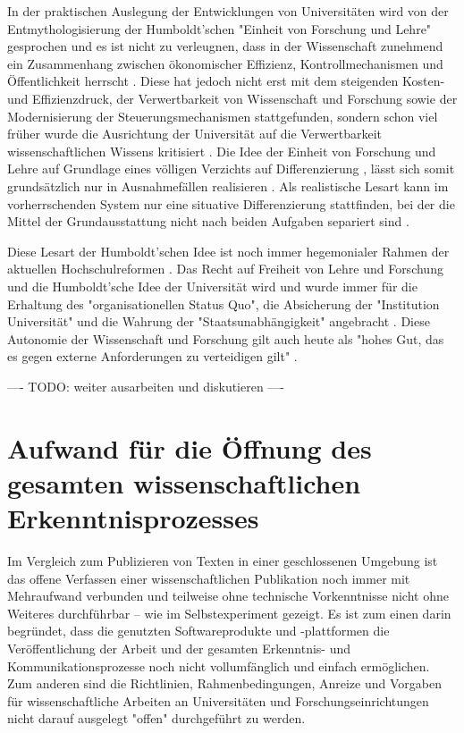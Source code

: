 In der praktischen Auslegung der Entwicklungen von Universitäten wird von der Entmythologisierung der Humboldt’schen "Einheit von Forschung und Lehre" gesprochen \cite{binswanger_2014_excellence} \cite[:299]{Schimank_2001} \cite[:343]{Kruecken_2001} und es ist nicht zu verleugnen, dass in der Wissenschaft zunehmend ein Zusammenhang zwischen ökonomischer Effizienz, Kontrollmechanismen und Öffentlichkeit herrscht \cite[:27]{Reinhart_intransparenz_2006} \cite{foucault_1977_uberwachen}. Diese hat jedoch nicht erst mit dem steigenden Kosten- und Effizienzdruck, der Verwertbarkeit von Wissenschaft und Forschung sowie der Modernisierung der Steuerungsmechanismen stattgefunden, sondern schon viel früher wurde die Ausrichtung der Universität auf die Verwertbarkeit wissenschaftlichen Wissens kritisiert \cite{Huber_2005}. Die Idee der Einheit von Forschung und Lehre auf Grundlage eines völligen Verzichts auf Differenzierung \cite{kittler_2004}, lässt sich somit grundsätzlich nur in Ausnahmefällen realisieren \cite{Schimank_2001}. Als realistische Lesart kann im vorherrschenden System nur eine situative Differenzierung stattfinden, bei der die Mittel der Grundausstattung nicht nach beiden Aufgaben separiert sind \cite{Schimank_2001}.

Diese Lesart der Humboldt’schen Idee ist noch immer hegemonialer Rahmen der aktuellen Hochschulreformen \cite{Huber_2005}. Das Recht auf Freiheit von Lehre und Forschung und die Humboldt’sche Idee der Universität wird und wurde immer für die Erhaltung des "organisationellen Status Quo", die Absicherung der "Institution Universität" und die Wahrung der "Staatsunabhängigkeit" angebracht \cite{Huber_2005}. Diese Autonomie der Wissenschaft und Forschung gilt auch heute als "hohes Gut, das es gegen externe Anforderungen zu verteidigen gilt" \cite{kaldewey_2010}.

---- TODO: weiter ausarbeiten und diskutieren ----

\section{Aufwand für die Öffnung des gesamten wissenschaftlichen Erkenntnisprozesses}

Im Vergleich zum Publizieren von Texten in einer geschlossenen Umgebung ist das offene Verfassen einer wissenschaftlichen Publikation noch immer mit Mehraufwand verbunden und teilweise ohne technische Vorkenntnisse nicht ohne Weiteres durchführbar – wie im Selbstexperiment gezeigt. Es ist zum einen darin begründet, dass die genutzten Softwareprodukte und -plattformen die Veröffentlichung der Arbeit und der gesamten Erkenntnis- und Kommunikationsprozesse noch nicht vollumfänglich und einfach ermöglichen. Zum anderen sind die Richtlinien, Rahmenbedingungen, Anreize und Vorgaben für wissenschaftliche Arbeiten an Universitäten und Forschungseinrichtungen nicht darauf ausgelegt "offen" durchgeführt zu werden.

